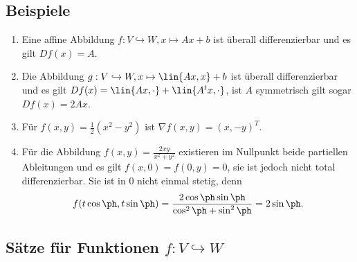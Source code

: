 \subsection{Beispiele}
\begin{enumerate}
  \item Eine affine Abbildung $f: V\hookrightarrow W, x \mapsto Ax+b$ ist
  überall differenzierbar und es gilt $Df(x) = A$.
  \item Die Abbildung $g: V\hookrightarrow W, x \mapsto
  \lin{Ax,x}+b$ ist überall differenzierbar und es gilt $Df(x) =
  \lin{Ax,\cdot} + \lin{A^tx,\cdot}$, ist $A$ symmetrisch gilt sogar $Df(x) =
  2Ax$.
  \item Für $f(x,y) = \frac{1}{2}(x^2-y^2)$ ist $\nabla f(x,y) = (x,-y)^T$.
  \item Für die Abbildung $f(x,y) = \frac{2xy}{x^2+y^2}$ existieren im 
  Nullpunkt beide partiellen Ableitungen und es gilt $f(x,0) = f(0,y) = 0$, sie
  ist jedoch nicht total differenzierbar. Sie ist in $0$ nicht einmal
  stetig, denn
  \begin{align*}
  f(t\cos \ph,t\sin\ph) = \frac{2\cos\ph\sin\ph}{\cos^2 \ph + \sin^2\ph} =
  2\sin\ph.
  \end{align*}
\end{enumerate}

\subsection{Sätze für Funktionen $f: V \hookrightarrow W$}

